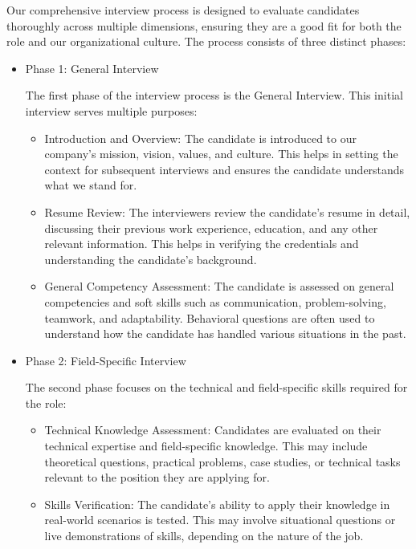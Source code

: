 Our comprehensive interview process is designed to evaluate candidates thoroughly across multiple dimensions, ensuring they are a good fit for both the role and our organizational culture. The process consists of three distinct phases:
\begin{itemize}
\item Phase 1: General Interview

The first phase of the interview process is the General Interview. This initial interview serves multiple purposes:

     \begin{itemize}

    \item Introduction and Overview:
        The candidate is introduced to our company's mission, vision, values, and culture. This helps in setting the context for subsequent interviews and ensures the candidate understands what we stand for.

    \item Resume Review:
        The interviewers review the candidate’s resume in detail, discussing their previous work experience, education, and any other relevant information. This helps in verifying the credentials and understanding the candidate’s background.

    \item General Competency Assessment:
        The candidate is assessed on general competencies and soft skills such as communication, problem-solving, teamwork, and adaptability. Behavioral questions are often used to understand how the candidate has handled various situations in the past.
   \end{itemize} 
\item Phase 2: Field-Specific Interview

The second phase focuses on the technical and field-specific skills required for the role:
    \begin{itemize}
    \item Technical Knowledge Assessment:
        Candidates are evaluated on their technical expertise and field-specific knowledge. This may include theoretical questions, practical problems, case studies, or technical tasks relevant to the position they are applying for.

    \item Skills Verification:
        The candidate’s ability to apply their knowledge in real-world scenarios is tested. This may involve situational questions or live demonstrations of skills, depending on the nature of the job.


\end{itemize}
\end{itemize}
